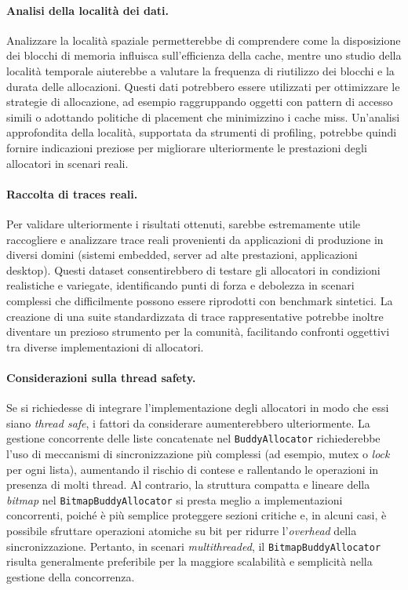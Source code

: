 \paragraph{Analisi della località dei dati.}
Analizzare la località spaziale permetterebbe di comprendere come la disposizione dei blocchi di memoria influisca sull'efficienza della cache, mentre uno studio della località temporale aiuterebbe a valutare la frequenza di riutilizzo dei blocchi e la durata delle allocazioni. Questi dati potrebbero essere utilizzati per ottimizzare le strategie di allocazione, ad esempio raggruppando oggetti con pattern di accesso simili o adottando politiche di placement che minimizzino i cache miss. Un'analisi approfondita della località, supportata da strumenti di profiling, potrebbe quindi fornire indicazioni preziose per migliorare ulteriormente le prestazioni degli allocatori in scenari reali.

\paragraph{Raccolta di traces reali.}
Per validare ulteriormente i risultati ottenuti, sarebbe estremamente utile raccogliere e analizzare trace reali provenienti da applicazioni di produzione in diversi domini (sistemi embedded, server ad alte prestazioni, applicazioni desktop). Questi dataset consentirebbero di testare gli allocatori in condizioni realistiche e variegate, identificando punti di forza e debolezza in scenari complessi che difficilmente possono essere riprodotti con benchmark sintetici. La creazione di una suite standardizzata di trace rappresentative potrebbe inoltre diventare un prezioso strumento per la comunità, facilitando confronti oggettivi tra diverse implementazioni di allocatori. 

\paragraph{Considerazioni sulla thread safety.}
Se si richiedesse di integrare l'implementazione degli allocatori in modo che essi siano \textit{thread safe}, i fattori da considerare aumenterebbero ulteriormente. La gestione concorrente delle liste concatenate nel \texttt{BuddyAllocator} richiederebbe l'uso di meccanismi di sincronizzazione più complessi (ad esempio, mutex o \textit{lock} per ogni lista), aumentando il rischio di contese e rallentando le operazioni in presenza di molti thread. Al contrario, la struttura compatta e lineare della \textit{bitmap} nel \texttt{BitmapBuddyAllocator} si presta meglio a implementazioni concorrenti, poiché è più semplice proteggere sezioni critiche e, in alcuni casi, è possibile sfruttare operazioni atomiche su bit per ridurre l'\textit{overhead} della sincronizzazione. Pertanto, in scenari \textit{multithreaded}, il \texttt{BitmapBuddyAllocator} risulta generalmente preferibile per la maggiore scalabilità e semplicità nella gestione della concorrenza.

